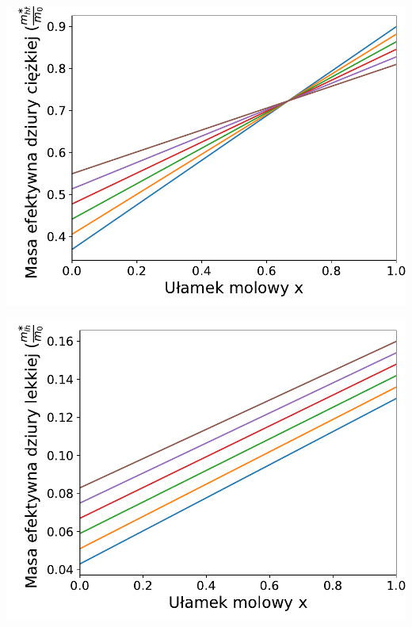 \documentclass[12pt,openany,a4paper]{book}
\begin{document}
\begin{minipage}[t]{0.5\textwidth}
	\includegraphics[width = \linewidth]{Figures/quaternary/quat_m_hh_y.pdf}\label{fig:quat_mhh_y}
\end{minipage}
\begin{minipage}[t]{0.5\textwidth}
	\includegraphics[width = \linewidth]{Figures/quaternary/quat_m_lh_y.pdf}\label{fig:quat_mlh_y}
\end{minipage}
\end{document}
